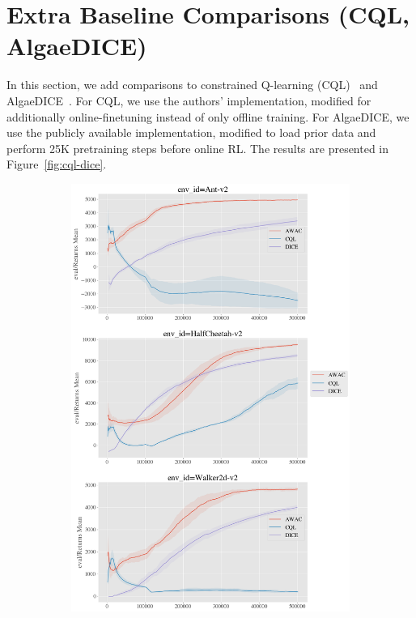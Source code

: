 \pagebreak

\section{Extra Baseline Comparisons (CQL, AlgaeDICE)}

In this section, we add comparisons to constrained Q-learning (CQL)~\citep{kumar2020cql} and AlgaeDICE~\citep{nachum2019dualdice}. For CQL, we use the authors' implementation, modified for additionally online-finetuning instead of only offline training. For AlgaeDICE, we use the publicly available implementation, modified to load prior data and perform 25K pretraining steps before online RL. The results are presented in Figure~\ref{fig:cql-dice}.

\begin{figure}[H]
    \centering
    \begin{subfigure}[b]{0.49\textwidth}
        \center
        \includegraphics[width=\textwidth]{awac/figures/iclrrebuttal/d4rl_mujoco_comparisons.png}

\end{subfigure}
\end{figure}
